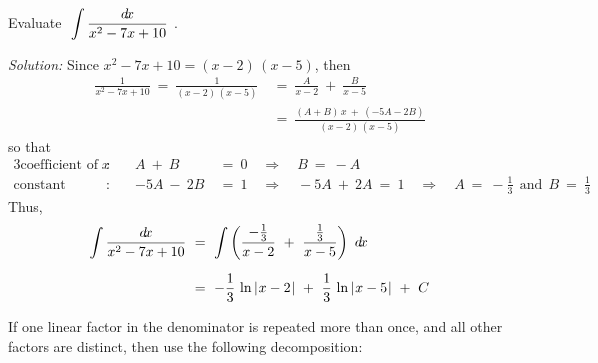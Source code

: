 \begin{exmp}\label{exmp:partfrac1}
\noindent Evaluate $~\displaystyle\int \frac{d\!x}{x^2 - 7x + 10}~$.\vspace{1mm}
\par\noindent\emph{Solution:} Since $x^2 - 7x + 10 = (x-2)\,(x-5)$, then
\begin{align*}
\frac{1}{x^2 - 7x + 10} ~=~ \frac{1}{(x-2)\,(x-5)} ~&=~ \frac{A}{x-2} ~+~ \frac{B}{x-5}\\[4pt]
&=~ \frac{(A+B)\,x ~+~ (-5A - 2B)}{(x-2)\,(x-5)}
\end{align*}
so that
\begin{alignat*}{3}
\text{coefficient of $x$}&: \quad & A ~+~ B ~&=~ 0 \quad\Rightarrow\quad B ~=~ -A\\
\text{constant term}&: & -5A ~-~ 2B ~&=~ 1 \quad\Rightarrow\quad -5A ~+~ 2A ~=~ 1
 \quad\Rightarrow\quad A ~=~ -\frac{1}{3} ~~\text{and}~~ B ~=~ \frac{1}{3}
\end{alignat*}
Thus,
\begin{align*}
\int \frac{d\!x}{x^2 - 7x + 10} ~&=~ \int \left(\frac{-\frac{1}{3}}{x-2} ~+~
\frac{\frac{1}{3}}{x-5} \right)~d\!x\\[6pt]
&=~ -\frac{1}{3}\,\ln\,\lvert\mspace{1mu}x-2\mspace{1mu}\rvert ~+~ \frac{1}{3}\,\ln\,\lvert\mspace{1mu}x-5\mspace{1mu}\rvert ~+~ C
\end{align*}
\end{exmp}
\divider
\newpage
If one linear factor in the denominator is repeated more than once, and all
other factors are distinct, then use the following decomposition:

\label{cmnt:part-frac-case-2}

